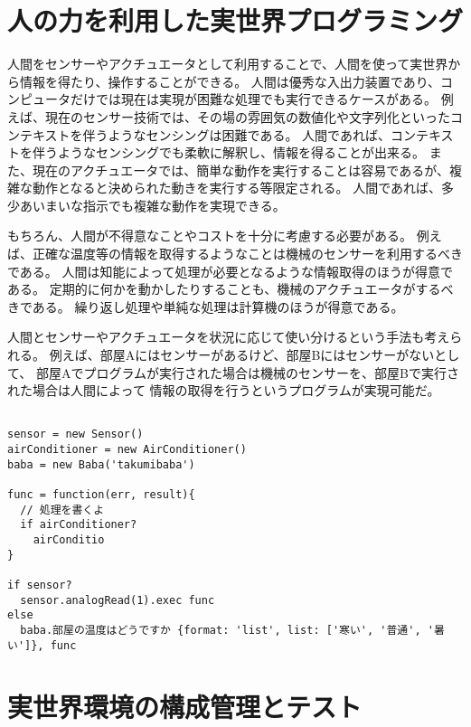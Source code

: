 \section{人の力を利用した実世界プログラミング}\label{ux4ebaux306eux529bux3092ux5229ux7528ux3057ux305fux5b9fux4e16ux754cux30d7ux30edux30b0ux30e9ux30dfux30f3ux30b0}

人間をセンサーやアクチュエータとして利用することで、人間を使って実世界から情報を得たり、操作することができる。
人間は優秀な入出力装置であり、コンピュータだけでは現在は実現が困難な処理でも実行できるケースがある。
例えば、現在のセンサー技術では、その場の雰囲気の数値化や文字列化といったコンテキストを伴うようなセンシングは困難である。
人間であれば、コンテキストを伴うようなセンシングでも柔軟に解釈し、情報を得ることが出来る。
また、現在のアクチュエータでは、簡単な動作を実行することは容易であるが、複雑な動作となると決められた動きを実行する等限定される。
人間であれば、多少あいまいな指示でも複雑な動作を実現できる。

もちろん、人間が不得意なことやコストを十分に考慮する必要がある。
例えば、正確な温度等の情報を取得するようなことは機械のセンサーを利用するべきである。
人間は知能によって処理が必要となるような情報取得のほうが得意である。
定期的に何かを動かしたりすることも、機械のアクチュエータがするべきである。
繰り返し処理や単純な処理は計算機のほうが得意である。

人間とセンサーやアクチュエータを状況に応じて使い分けるという手法も考えられる。
例えば、部屋Aにはセンサーがあるけど、部屋Bにはセンサーがないとして、
部屋Aでプログラムが実行された場合は機械のセンサーを、部屋Bで実行された場合は人間によって
情報の取得を行うというプログラムが実現可能だ。

\begin{lstlisting}

sensor = new Sensor()
airConditioner = new AirConditioner()
baba = new Baba('takumibaba')

func = function(err, result){
  // 処理を書くよ
  if airConditioner?
    airConditio
}

if sensor?
  sensor.analogRead(1).exec func
else
  baba.部屋の温度はどうですか {format: 'list', list: ['寒い', '普通', '暑い']}, func
\end{lstlisting}

\section{実世界環境の構成管理とテスト}\label{ux5b9fux4e16ux754cux74b0ux5883ux306eux69cbux6210ux7ba1ux7406ux3068ux30c6ux30b9ux30c8}

